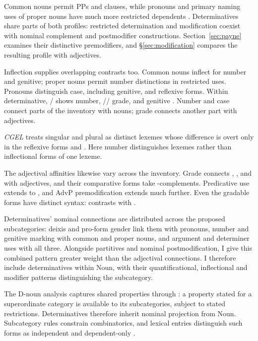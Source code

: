 \documentclass[12pt]{article}
\begin{document}
Common nouns permit PPs and clauses, while pronouns and primary naming uses of proper nouns have much more restricted dependents \citep[429--430, 439--443, 517--521]{huddleston2002}. Determinatives share parts of both profiles: restricted determination and modification coexist with nominal complement and postmodifier constructions. Section~\ref{sec:payne} examines their distinctive premodifiers, and §\ref{sec:modification} compares the resulting profile with adjectives.

Inflection supplies overlapping contrasts too. Common nouns inflect for number and genitive; proper nouns permit number distinctions in restricted uses. Pronouns distinguish case, including genitive, and reflexive forms. Within determinative, / shows number, // grade, and  genitive \citep[373, 423--424, 426, 479--480, 521]{huddleston2002}. Number and case connect parts of the inventory with nouns; grade connects another part with adjectives.

\textit{CGEL} treats singular and plural  as distinct lexemes whose difference is overt only in the reflexive forms  and  \citep[486]{huddleston2002}. Here number distinguishes lexemes rather than inflectional forms of one lexeme.

The adjectival affinities likewise vary across the inventory. Grade connects , ,  and  with adjectives, and their comparative forms take -complements. Predicative use extends to , and AdvP premodification extends much further. Even the gradable forms have distinct syntax:  contrasts with  \citep[392--396, 539--540]{huddleston2002}.

Determinatives' nominal connections are distributed across the proposed subcategories: deixis and pro-form gender link them with pronouns, number and genitive marking with common and proper nouns, and argument and determiner uses with all three. Alongside partitives and nominal postmodification, I give this combined pattern greater weight than the adjectival connections. I therefore include determinatives within Noun, with their quantificational, inflectional and modifier patterns distinguishing the subcategory.

The D-noun analysis captures shared properties through : a property stated for a superordinate category is available to its subcategories, subject to stated restrictions. Determinatives therefore inherit nominal projection from Noun. Subcategory rules constrain combinatorics, and lexical entries distinguish such forms as independent  and dependent-only .
\end{document}
